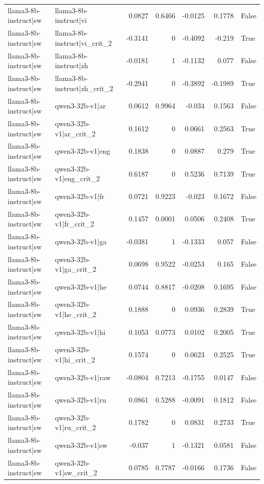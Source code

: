 \begin{table}
\begin{tabular}{l l r r r r l}
llama3-8b-instruct|sw & llama3-8b-instruct|vi & 0.0827 & 0.6466 & -0.0125 & 0.1778 & False \\
llama3-8b-instruct|sw & llama3-8b-instruct|vi_crit_2 & -0.3141 & 0 & -0.4092 & -0.219 & True \\
llama3-8b-instruct|sw & llama3-8b-instruct|zh & -0.0181 & 1 & -0.1132 & 0.077 & False \\
llama3-8b-instruct|sw & llama3-8b-instruct|zh_crit_2 & -0.2941 & 0 & -0.3892 & -0.1989 & True \\
llama3-8b-instruct|sw & qwen3-32b-v1|ar & 0.0612 & 0.9964 & -0.034 & 0.1563 & False \\
llama3-8b-instruct|sw & qwen3-32b-v1|ar_crit_2 & 0.1612 & 0 & 0.0661 & 0.2563 & True \\
llama3-8b-instruct|sw & qwen3-32b-v1|eng & 0.1838 & 0 & 0.0887 & 0.279 & True \\
llama3-8b-instruct|sw & qwen3-32b-v1|eng_crit_2 & 0.6187 & 0 & 0.5236 & 0.7139 & True \\
llama3-8b-instruct|sw & qwen3-32b-v1|fr & 0.0721 & 0.9223 & -0.023 & 0.1672 & False \\
llama3-8b-instruct|sw & qwen3-32b-v1|fr_crit_2 & 0.1457 & 0.0001 & 0.0506 & 0.2408 & True \\
llama3-8b-instruct|sw & qwen3-32b-v1|ga & -0.0381 & 1 & -0.1333 & 0.057 & False \\
llama3-8b-instruct|sw & qwen3-32b-v1|ga_crit_2 & 0.0698 & 0.9522 & -0.0253 & 0.165 & False \\
llama3-8b-instruct|sw & qwen3-32b-v1|he & 0.0744 & 0.8817 & -0.0208 & 0.1695 & False \\
llama3-8b-instruct|sw & qwen3-32b-v1|he_crit_2 & 0.1888 & 0 & 0.0936 & 0.2839 & True \\
llama3-8b-instruct|sw & qwen3-32b-v1|hi & 0.1053 & 0.0773 & 0.0102 & 0.2005 & True \\
llama3-8b-instruct|sw & qwen3-32b-v1|hi_crit_2 & 0.1574 & 0 & 0.0623 & 0.2525 & True \\
llama3-8b-instruct|sw & qwen3-32b-v1|raw & -0.0804 & 0.7213 & -0.1755 & 0.0147 & False \\
llama3-8b-instruct|sw & qwen3-32b-v1|ru & 0.0861 & 0.5288 & -0.0091 & 0.1812 & False \\
llama3-8b-instruct|sw & qwen3-32b-v1|ru_crit_2 & 0.1782 & 0 & 0.0831 & 0.2733 & True \\
llama3-8b-instruct|sw & qwen3-32b-v1|sw & -0.037 & 1 & -0.1321 & 0.0581 & False \\
llama3-8b-instruct|sw & qwen3-32b-v1|sw_crit_2 & 0.0785 & 0.7787 & -0.0166 & 0.1736 & False \\

\end{tabular}
\end{table}
